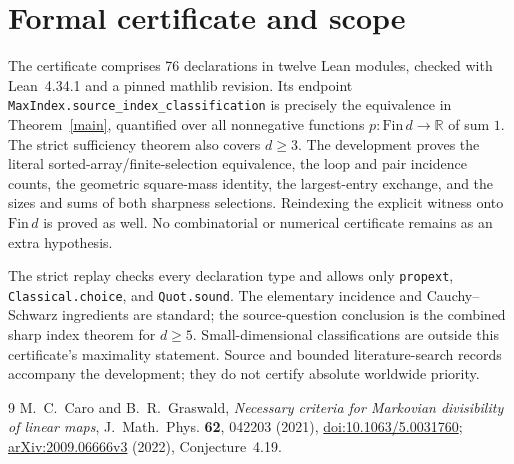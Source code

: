 \documentclass[11pt]{article}
\begin{document}
\section{Formal certificate and scope}
The certificate comprises 76 declarations in twelve Lean modules,
checked with Lean~4.34.1 and a pinned mathlib revision. Its endpoint
\texttt{MaxIndex.source\_index\_classification} is precisely the
equivalence in Theorem~\ref{main}, quantified over all
nonnegative functions $p:\mathrm{Fin}\,d\to\mathbb R$ of sum $1$.
The strict sufficiency theorem also covers $d\ge3$.
The development proves the literal sorted-array/finite-selection
equivalence, the loop and pair incidence counts, the geometric
square-mass identity, the largest-entry exchange, and the sizes and
sums of both sharpness selections. Reindexing the explicit witness
onto $\mathrm{Fin}\,d$ is proved as well. No combinatorial or
numerical certificate remains as an extra hypothesis.

The strict replay checks every declaration type and allows only
\texttt{propext}, \texttt{Classical.choice}, and \texttt{Quot.sound}.
The elementary incidence and Cauchy--Schwarz ingredients are
standard; the source-question conclusion is the combined sharp
index theorem for $d\ge5$. Small-dimensional classifications are
outside this certificate's maximality statement. Source and
bounded literature-search records accompany the development;
they do not certify absolute worldwide priority.

\begin{thebibliography}{9}
M.~C.~Caro and B.~R.~Graswald,
\emph{Necessary criteria for Markovian divisibility of linear maps},
J.~Math.~Phys. \textbf{62}, 042203 (2021),
\href{https://doi.org/10.1063/5.0031760}{doi:10.1063/5.0031760};
\href{https://arxiv.org/abs/2009.06666v3}{arXiv:2009.06666v3} (2022),
Conjecture~4.19.
\end{thebibliography}
\end{document}

